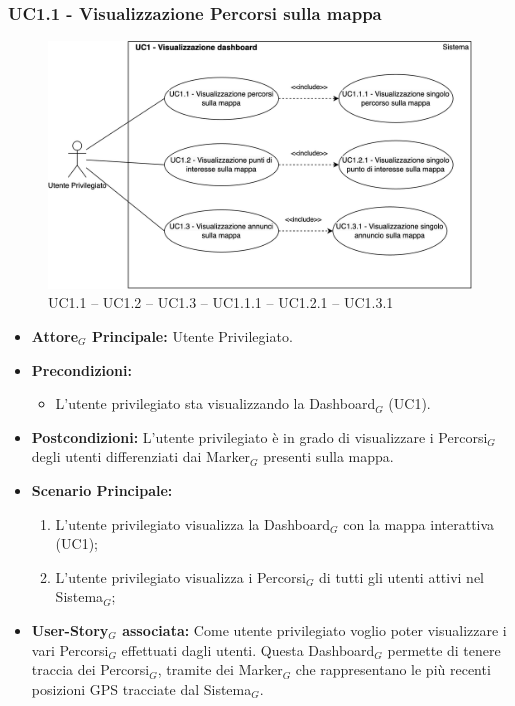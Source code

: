 \documentclass[10pt]{article}
\begin{document}
\begin{justify}
\subsubsection{\textbf{UC1.1 - Visualizzazione Percorsi sulla mappa}}
\begin{figure}[H]
    \centering
    \includegraphics[width=0.7\linewidth]{UC1.123image.png}
    \caption{ UC1.1 -- UC1.2 -- UC1.3 -- UC1.1.1 -- UC1.2.1 -- UC1.3.1}
    \label{fig:UC1.1}
\end{figure}
\label{UC1.1}
\begin{itemize}
     \item \textbf{Attore$_G$ Principale:} Utente Privilegiato.
     \item \textbf{Precondizioni:}
        \begin{itemize}
    		\item L'utente privilegiato sta visualizzando la Dashboard$_G$ (UC1).
        \end{itemize}
     \item \textbf{Postcondizioni:} L'utente privilegiato è in grado di visualizzare i Percorsi$_G$ degli utenti differenziati dai Marker$_G$ presenti sulla mappa.
     \item \textbf{Scenario Principale:}
        \begin{enumerate}
            \item L'utente privilegiato visualizza la Dashboard$_G$ con la mappa interattiva (UC1);
            \item L'utente privilegiato visualizza i Percorsi$_G$ di tutti gli utenti attivi nel Sistema$_G$;
        \end{enumerate}
     \item \textbf{User-Story$_G$ associata:}
     Come utente privilegiato voglio poter visualizzare i vari Percorsi$_G$ effettuati dagli utenti. Questa Dashboard$_G$ permette di tenere traccia dei Percorsi$_G$, tramite dei Marker$_G$ che rappresentano le più recenti posizioni GPS tracciate dal Sistema$_G$.
\end{itemize}

\end{justify}
\end{document}
